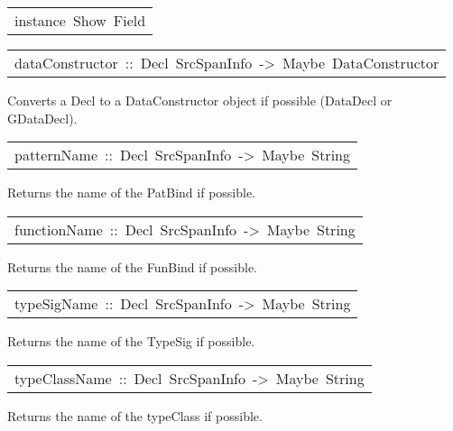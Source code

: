 \begin{haddockdesc}
\item[\begin{tabular}{@{}l}
instance\ Show\ Field
\end{tabular}]
\end{haddockdesc}
\begin{haddockdesc}
\item[\begin{tabular}{@{}l}
dataConstructor\ ::\ Decl\ SrcSpanInfo\ ->\ Maybe\ DataConstructor
\end{tabular}]\haddockbegindoc
Converts a Decl to a DataConstructor object if possible (DataDecl or
   GDataDecl).\par

\end{haddockdesc}
\begin{haddockdesc}
\item[\begin{tabular}{@{}l}
patternName\ ::\ Decl\ SrcSpanInfo\ ->\ Maybe\ String
\end{tabular}]\haddockbegindoc
Returns the name of the PatBind if possible.\par

\end{haddockdesc}
\begin{haddockdesc}
\item[\begin{tabular}{@{}l}
functionName\ ::\ Decl\ SrcSpanInfo\ ->\ Maybe\ String
\end{tabular}]\haddockbegindoc
Returns the name of the FunBind if possible.\par

\end{haddockdesc}
\begin{haddockdesc}
\item[\begin{tabular}{@{}l}
typeSigName\ ::\ Decl\ SrcSpanInfo\ ->\ Maybe\ String
\end{tabular}]\haddockbegindoc
Returns the name of the TypeSig if possible.\par

\end{haddockdesc}
\begin{haddockdesc}
\item[\begin{tabular}{@{}l}
typeClassName\ ::\ Decl\ SrcSpanInfo\ ->\ Maybe\ String
\end{tabular}]\haddockbegindoc
Returns the name of the typeClass if possible.\par

\end{haddockdesc}
